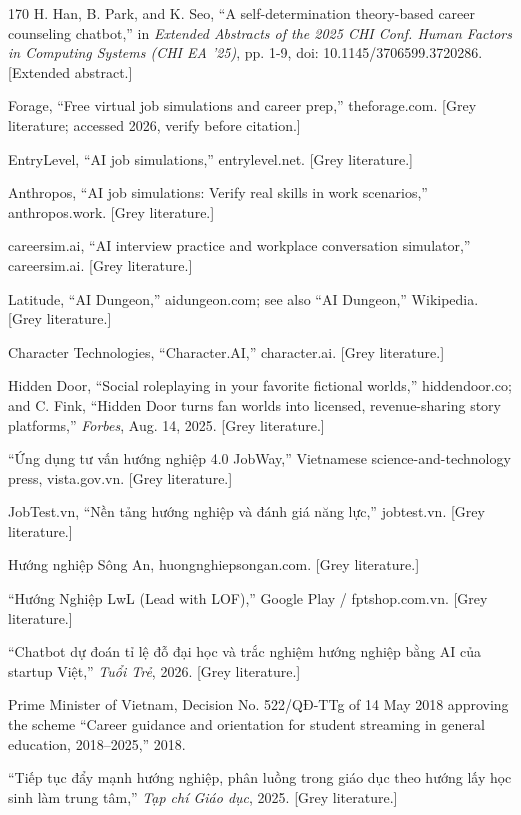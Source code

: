 \begin{thebibliography}{170}
 H. Han, B. Park, and K. Seo, ``A self-determination theory-based career counseling chatbot,'' in \textit{Extended Abstracts of the 2025 CHI Conf. Human Factors in Computing Systems (CHI EA '25)}, pp. 1-9, doi: 10.1145/3706599.3720286. [Extended abstract.]

 Forage, ``Free virtual job simulations and career prep,'' theforage.com. [Grey literature; accessed 2026, verify before citation.]

 EntryLevel, ``AI job simulations,'' entrylevel.net. [Grey literature.]

 Anthropos, ``AI job simulations: Verify real skills in work scenarios,'' anthropos.work. [Grey literature.]

 careersim.ai, ``AI interview practice and workplace conversation simulator,'' careersim.ai. [Grey literature.]

 Latitude, ``AI Dungeon,'' aidungeon.com; see also ``AI Dungeon,'' Wikipedia. [Grey literature.]

 Character Technologies, ``Character.AI,'' character.ai. [Grey literature.]

 Hidden Door, ``Social roleplaying in your favorite fictional worlds,'' hiddendoor.co; and C. Fink, ``Hidden Door turns fan worlds into licensed, revenue-sharing story platforms,'' \textit{Forbes}, Aug. 14, 2025. [Grey literature.]

 ``Ứng dụng tư vấn hướng nghiệp 4.0 JobWay,'' Vietnamese science-and-technology press, vista.gov.vn. [Grey literature.]

 JobTest.vn, ``Nền tảng hướng nghiệp và đánh giá năng lực,'' jobtest.vn. [Grey literature.]

 Hướng nghiệp Sông An, huongnghiepsongan.com. [Grey literature.]

 ``Hướng Nghiệp LwL (Lead with LOF),'' Google Play / fptshop.com.vn. [Grey literature.]

 ``Chatbot dự đoán tỉ lệ đỗ đại học và trắc nghiệm hướng nghiệp bằng AI của startup Việt,'' \textit{Tuổi Trẻ}, 2026. [Grey literature.]

 Prime Minister of Vietnam, Decision No. 522/QĐ-TTg of 14 May 2018 approving the scheme ``Career guidance and orientation for student streaming in general education, 2018--2025,'' 2018.

 ``Tiếp tục đẩy mạnh hướng nghiệp, phân luồng trong giáo dục theo hướng lấy học sinh làm trung tâm,'' \textit{Tạp chí Giáo dục}, 2025. [Grey literature.]


\end{thebibliography}
